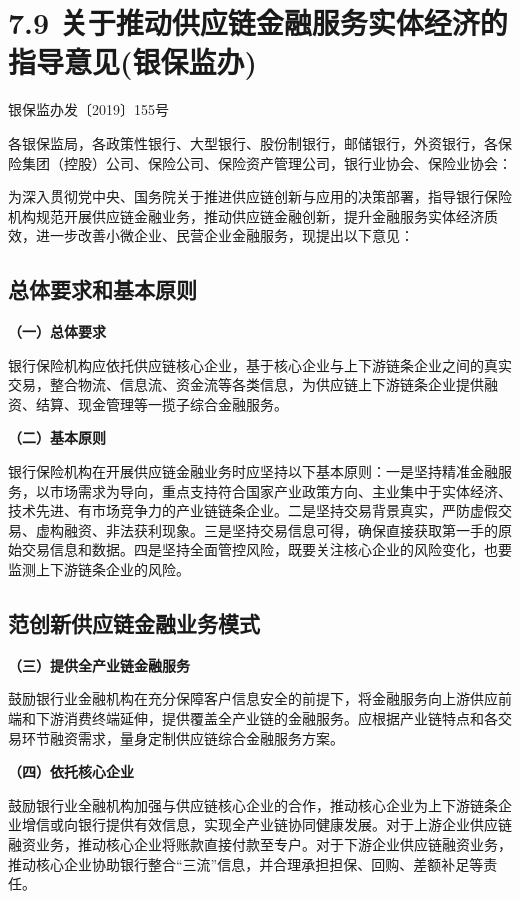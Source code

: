 \chapter{7.9 关于推动供应链金融服务实体经济的指导意见(银保监办)} %

\begin{center}
{\small 银保监办发〔2019〕155号} \\
\end{center}

\noindent 各银保监局，各政策性银行、大型银行、股份制银行，邮储银行，外资银行，各保险集团（控股）公司、保险公司、保险资产管理公司，银行业协会、保险业协会：

为深入贯彻党中央、国务院关于推进供应链创新与应用的决策部署，指导银行保险机构规范开展供应链金融业务，推动供应链金融创新，提升金融服务实体经济质效，进一步改善小微企业、民营企业金融服务，现提出以下意见：

\section{总体要求和基本原则}

{ \bf （一）总体要求}

银行保险机构应依托供应链核心企业，基于核心企业与上下游链条企业之间的真实交易，整合物流、信息流、资金流等各类信息，为供应链上下游链条企业提供融资、结算、现金管理等一揽子综合金融服务。

{ \bf （二）基本原则}

银行保险机构在开展供应链金融业务时应坚持以下基本原则：一是坚持精准金融服务，以市场需求为导向，重点支持符合国家产业政策方向、主业集中于实体经济、技术先进、有市场竞争力的产业链链条企业。二是坚持交易背景真实，严防虚假交易、虚构融资、非法获利现象。三是坚持交易信息可得，确保直接获取第一手的原始交易信息和数据。四是坚持全面管控风险，既要关注核心企业的风险变化，也要监测上下游链条企业的风险。

\section{范创新供应链金融业务模式}

{ \bf （三）提供全产业链金融服务}

鼓励银行业金融机构在充分保障客户信息安全的前提下，将金融服务向上游供应前端和下游消费终端延伸，提供覆盖全产业链的金融服务。应根据产业链特点和各交易环节融资需求，量身定制供应链综合金融服务方案。

{ \bf （四）依托核心企业}

鼓励银行业全融机构加强与供应链核心企业的合作，推动核心企业为上下游链条企业增信或向银行提供有效信息，实现全产业链协同健康发展。对于上游企业供应链融资业务，推动核心企业将账款直接付款至专户。对于下游企业供应链融资业务，推动核心企业协助银行整合“三流”信息，并合理承担担保、回购、差额补足等责任。

